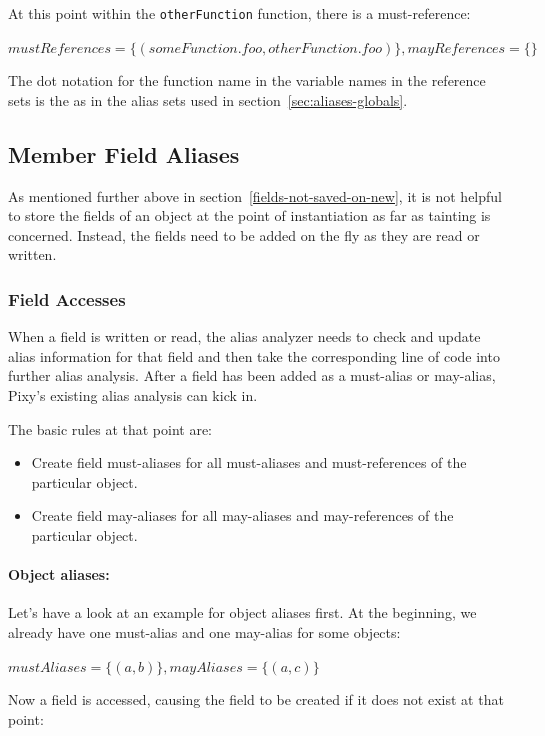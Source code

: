 At this point within the \texttt{otherFunction} function, there is a must-reference:

$mustReferences = \{(someFunction.foo, otherFunction.foo)\}, mayReferences = \{\}$

The dot notation for the function name in the variable names in the reference sets is the as in the alias sets used in section~\ref{sec:aliases-globals}.


\subsection{Member Field Aliases}

As mentioned further above in section~\ref{fields-not-saved-on-new}, it is not helpful to store the fields of an object at the point of instantiation as far as tainting is concerned. Instead, the fields need to be added on the fly as they are read or written.


\subsubsection{Field Accesses}

When a field is written or read, the alias analyzer needs to check and update alias information for that field and then take the corresponding line of code into further alias analysis. After a field has been added as a must-alias or may-alias, Pixy's existing alias analysis can kick in.

The basic rules at that point are:

\begin{itemize}
  \item Create field must-aliases for all must-aliases and must-references of the particular object.
  \item Create field may-aliases for all may-aliases and may-references of the particular object.
\end{itemize}


\paragraph{Object aliases:} Let's have a look at an example for object aliases first. At the beginning, we already have one must-alias and one may-alias for some objects:

$mustAliases = \{(a, b)\}, mayAliases = \{(a, c)\}$

Now a field is accessed, causing the field to be created if it does not exist at that point:

